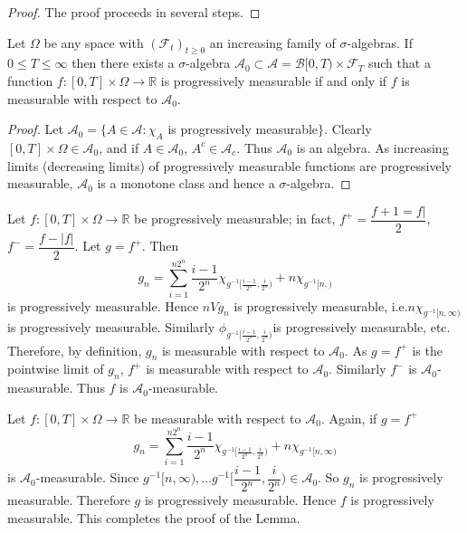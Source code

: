 \begin{proof}
The proof proceeds in several steps.
\end{proof}

\setcounter{lemma}{0}
\begin{lemma}
Let $\Omega$ be any space with $(\mathscr{F}_{t})_{t\geq 0}$ an
increasing family of $\sigma$-algebras. If $0\leq T\leq \infty$ then
there exists a $\sigma$-algebra $\mathscr{A}_{0}\subset
\mathscr{A}=\mathscr{B}[0,T)\times \mathscr{F}_{T}$ such that a
  function $f:[0,T]\times \Omega\to \mathbb{R}$ is progressively
  measurable if and only if $f$ is measurable with respect to
  $\mathscr{A}_{0}$. 
\end{lemma}

\begin{proof}
Let $\mathscr{A}_{0}=\{A\in \mathscr{A}:\chi_{A}$ is progressively
measurable$\}$. Clearly $[0,T]\times \Omega\in \mathscr{A}_{0}$, and
if $A\in \mathscr{A}_{0}$, $A^{c}\in \mathscr{A}_{c}$. Thus
$\mathscr{A}_{0}$ is an algebra. As increasing limits (decreasing
limits) of progressively measurable functions are progressively
measurable, $\mathscr{A}_{0}$ is a monotone class and hence a
$\sigma$-algebra.
\end{proof}

Let $f:[0,T]\times \Omega\to \mathbb{R}$ be progressively measurable;
in fact, $f^{+}=\dfrac{f+1=f|}{2}$, $f^{-}=\dfrac{f-|f|}{2}$. Let
$g=f^{+}$. Then
$$
g_{n}=\sum\limits^{n2^{n}}_{i=1}\frac{i-1}{2^{n}}\chi_{g^{-1}[\frac{i-1}{2^{n}},\frac{i}{2^{n}})}+n\chi_{g^{-1}[n,)}
$$
is progressively measurable. Hence $nVg_{n}$ is progressively
measurable, i.e.\@ $n\chi_{g^{-1}[n,\infty)}$ is progressively
  measurable. Similarly
  $\phi_{g^{-1}[\frac{i-1}{2^{n}},\frac{i}{2^{n}})}$\pageoriginale is
    progressively measurable, etc. Therefore, by definition, $g_{n}$
    is measurable with respect to $\mathscr{A}_{0}$. As $g=f^{+}$ is
    the pointwise limit of $g_{n}$, $f^{+}$ is measurable with respect
    to $\mathscr{A}_{0}$. Similarly $f^{-}$ is
    $\mathscr{A}_{0}$-measurable. Thus $f$ is
    $\mathscr{A}_{0}$-measurable. 

Let $f:[0,T]\times \Omega\to \mathbb{R}$ be measurable with respect to
$\mathscr{A}_{0}$. Again, if $g=f^{+}$
$$
g_{n}=\sum\limits^{n2^{n}}_{i=1}\frac{i-1}{2^{n}}\chi_{g^{-1}[\frac{i-1}{2^{n}},\frac{i}{2^{n}})}+n\chi_{g^{-1}[n,\infty)} 
$$
is $\mathscr{A}_{0}$-measurable. Since $g^{-1}[n,\infty),\ldots
  g^{-1}[\dfrac{i-1}{2^{n}},\dfrac{i}{2^{n}})\in \mathscr{A}_{0}$. So
    $g_{n}$ is progressively measurable. Therefore $g$ is
    progressively measurable. Hence $f$ is progressively
    measurable. This completes the proof of the Lemma.

